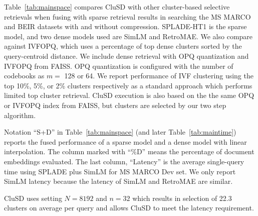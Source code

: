 	
Table~\ref{tab:mainspace} compares CluSD with other cluster-based selective retrievals when fusing with sparse retrieval results
in searching the MS MARCO and BEIR datasets with and without compression.  
SPLADE-HT1 is  the sparse model, and two dense models used are SimLM and RetroMAE.
We also compare against IVFOPQ, which uses a percentage of top dense clusters sorted by the query-centroid distance.
We include dense retrieval with OPQ quantization  and  IVFOPQ from FAISS.
OPQ quantization  is configured with  the number of codebooks as $m=$ 128 or 64.
We report performance of IVF clustering using the top 10\%, 5\%, or 2\% clusters respectively
as a standard approach which performs   limited top cluster retrieval.
CluSD execution is also based on the the same OPQ or  IVFOPQ index from  FAISS, but clusters are  selected  by our two step algorithm.

Notation ``S+D'' in Table~\ref{tab:mainspace} (and later Table~\ref{tab:maintime})
reports the fused performance of a sparse model and a dense model with linear interpolation.
The column marked with  ``\%D'' means the percentage of document embeddings  evaluated.
The last column,  ``Latency'' is the average single-query time using SPLADE plus SimLM for MS MARCO Dev set.
We only report SimLM latency because the latency of SimLM and RetroMAE are similar.

CluSD uses setting  $N=8192$ and 
$n=32$ 
which results in  selection of 22.3 clusters on average per query
and allows CluSD to meet  the latency requirement.





